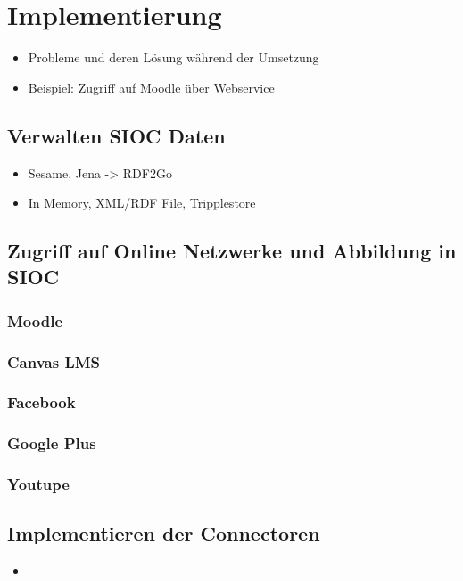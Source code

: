 
\chapter{Implementierung}
\label{ch:implementation}

\begin{itemize}
    \item Probleme und deren Lösung während der Umsetzung
    \item Beispiel: Zugriff auf Moodle über Webservice
\end{itemize}



\section{Verwalten SIOC Daten} %
\label{sec:zugriff_auf_sioc_daten}

\begin{itemize}
    \item Sesame, Jena -> RDF2Go
    \item In Memory, XML/RDF File, Tripplestore 
\end{itemize}


\section{Zugriff auf Online Netzwerke und Abbildung in SIOC} %
\label{sec:zugriff_auf_online_netzwerke_und_abbildung_in_sioc}

\subsection{Moodle} %
\label{sub:moodle}

\subsection{Canvas LMS} %
\label{sub:canvas_lms}

\subsection{Facebook} %
\label{sub:facebook}

\subsection{Google Plus} %
\label{sub:google_plus}

\subsection{Youtupe} %
\label{sub:youtupe}



\section{Implementieren der Connectoren} %
\label{sec:implementieren_der_connectoren}

\begin{itemize}
    \item 
\end{itemize}
